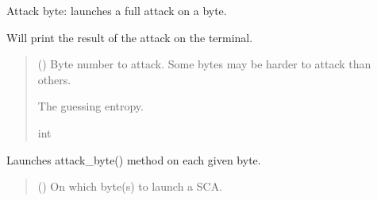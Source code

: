 \documentclass[letterpaper,10pt,english]{sphinxmanual}
\begin{document}
\begin{fulllineitems}
\begin{fulllineitems}
\begin{quote}
\begin{description}
\begin{itemize}
\end{itemize}

\end{description}\end{quote}

\end{fulllineitems}


\begin{fulllineitems}
\label{\detokenize{MLSCAlib.Attacks:MLSCAlib.Attacks.attack.Attack.attack_byte}}
\pysigstartsignatures
{}
\pysigstopsignatures
\sphinxAtStartPar
Attack byte: launches a full attack on a byte.

\sphinxAtStartPar
Will print the result of the attack on the terminal.
\begin{quote}\begin{description}
\sphinxAtStartPar
{} () \textendash{} Byte number to attack. Some bytes may be harder to attack than others.

\sphinxAtStartPar
{} \textendash{} The guessing entropy.

\sphinxAtStartPar
int

\end{description}\end{quote}

\end{fulllineitems}


\begin{fulllineitems}
\label{\detokenize{MLSCAlib.Attacks:MLSCAlib.Attacks.attack.Attack.attack_bytes}}
\pysigstartsignatures
{}
\pysigstopsignatures
\sphinxAtStartPar
Launches attack\_byte() method on each given byte.
\begin{quote}\begin{description}
\sphinxAtStartPar
{} (\sphinxstyleliteralemphasis{\sphinxupquote{{[}}}\sphinxstyleliteralemphasis{\sphinxupquote{{]}}}\sphinxstyleliteralemphasis{\sphinxupquote{,}}) \textendash{} On which byte(s) to launch a SCA.


\end{description}
\end{quote}
\end{fulllineitems}
\end{fulllineitems}
\end{document}
